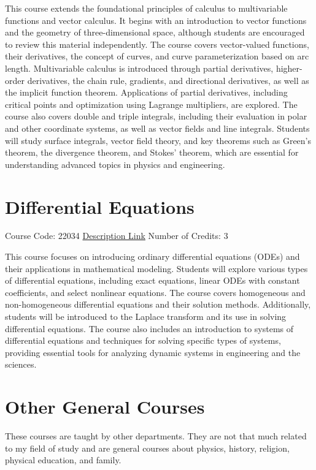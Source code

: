 This course extends the foundational principles of calculus to multivariable functions and vector calculus. It begins with an introduction to vector functions and the geometry of three-dimensional space, although students are encouraged to review this material independently. The course covers vector-valued functions, their derivatives, the concept of curves, and curve parameterization based on arc length. Multivariable calculus is introduced through partial derivatives, higher-order derivatives, the chain rule, gradients, and directional derivatives, as well as the implicit function theorem. Applications of partial derivatives, including critical points and optimization using Lagrange multipliers, are explored. The course also covers double and triple integrals, including their evaluation in polar and other coordinate systems, as well as vector fields and line integrals. Students will study surface integrals, vector field theory, and key theorems such as Green’s theorem, the divergence theorem, and Stokes' theorem, which are essential for understanding advanced topics in physics and engineering.


\section{Differential Equations}
Course Code: 22034 \qquad \quad \href{https://docs.ce.sharif.edu/course/22034}{Description Link}
\qquad \quad Number of Credits: 3

This course focuses on introducing ordinary differential equations (ODEs) and their applications in mathematical modeling. Students will explore various types of differential equations, including exact equations, linear ODEs with constant coefficients, and select nonlinear equations. The course covers homogeneous and non-homogeneous differential equations and their solution methods. Additionally, students will be introduced to the Laplace transform and its use in solving differential equations. The course also includes an introduction to systems of differential equations and techniques for solving specific types of systems, providing essential tools for analyzing dynamic systems in engineering and the sciences.

\section{Other General Courses}
These courses are taught by other departments. They are not that much related to my field of study and are general courses about physics, history, religion, physical education, and family.


